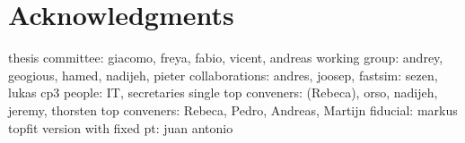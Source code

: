 \chapter*{Acknowledgments}

thesis committee: giacomo, freya, fabio, vicent, andreas
working group: andrey, geogious, hamed, nadijeh, pieter
collaborations: andres, joosep, 
fastsim: sezen, lukas
cp3 people: IT, secretaries
single top conveners: (Rebeca), orso, nadijeh, jeremy, thorsten
top conveners:  Rebeca, Pedro, Andreas, Martijn
fiducial: markus
topfit version with fixed pt: juan antonio